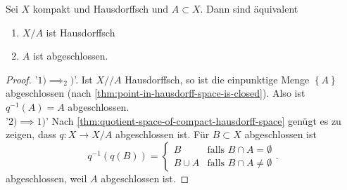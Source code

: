 \begin{corollary}
    Sei $X$ kompakt und Hausdorffsch und  $A\subset X$. Dann sind äquivalent
    \begin{enumerate}[1)]
        \item $X / A$ ist Hausdorffsch
        \item  $A$ ist abgeschlossen.
    \end{enumerate}
\end{corollary}
\begin{proof}
    '$1)\implies_2)$'. Ist $X // A$ Hausdorffsch, so ist die einpunktige Menge $\left \{A\right\} $ abgeschlossen (nach \ref{thm:point-in-hausdorff-space-is-closed}). Also ist $q^{-1}(A) = A$ abgeschlossen. \\
    '$2)\implies 1)$' Nach \ref{thm:quotient-space-of-compact-hausdorff-space} genügt es zu zeigen, dass $q: X \to  X / A$ abgeschlossen ist. Für $B\subset X$ abgeschlossen ist
    \[
        q^{-1}(q(B)) = \begin{cases}
            B & \text{falls } B\cap A = \emptyset \\
            B \cup A & \text{falls }B \cap  A \neq  \emptyset
        \end{cases}
    .\] 
    abgeschlossen, weil $A$ abgeschlossen ist. 
\end{proof}



